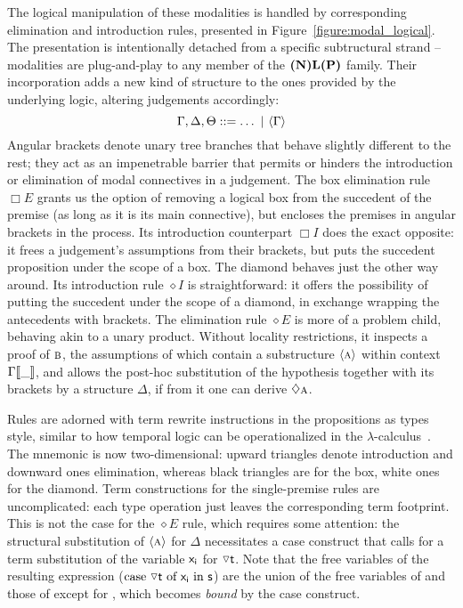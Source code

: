 The logical manipulation of these modalities is handled by corresponding elimination and introduction rules, presented in Figure~\ref{figure:modal_logical}.
The presentation is intentionally detached from a specific subtructural strand -- modalities are plug-and-play to any member of the $\textbf{(N)L(P)}$ family.
Their incorporation adds a new kind of structure to the ones provided by the underlying logic, altering judgements accordingly:
\[
	\Gamma, \Delta, \Theta ::= \dots \ | \ \bracket{\Gamma}
\]
Angular brackets denote unary tree branches that behave slightly different to the rest; they act as an impenetrable barrier that permits or hinders the introduction or elimination of modal connectives in a judgement.
The box elimination rule $\Box E$ grants us the option of removing a logical box from the succedent of the premise (as long as it is its main connective), but encloses the premises in angular brackets in the process.
Its introduction counterpart $\Box I$ does the exact opposite: it frees a judgement's assumptions from their brackets, but puts the succedent proposition under the scope of a box.
The diamond behaves just the other way around.
Its introduction rule $\diamond I$ is straightforward: it offers the possibility of putting the succedent under the scope of a diamond, in exchange wrapping the antecedents with brackets.
The elimination rule $\diamond E$ is more of a problem child, behaving akin to a unary product.
Without locality restrictions, it inspects a proof of $\smallprop{B}$, the assumptions of which contain a substructure $\bracket{\smallprop{A}}$ within context $\Gamma{\llbracket{\_}\rrbracket}$, and allows the post-hoc substitution of the hypothesis together with its brackets by a structure $\Delta$, if from it one can derive $\diamond \smallprop{A}$.

Rules are adorned with term rewrite instructions in the propositions as types style, similar to how temporal logic can be operationalized in the $\lambda$-calculus~\cite{wansing2002sequent}.
The mnemonic is now two-dimensional: upward triangles denote introduction and downward ones elimination, whereas black triangles are for the box, white ones for the diamond.
Term constructions for the single-premise rules are uncomplicated: each type operation just leaves the corresponding term footprint.
This is not the case for the $\diamond E$ rule, which requires some attention:
the structural substitution of $\bracket{\smallprop{A}}$ for $\Delta$ necessitates a case construct that calls for a term substitution of the variable $\mathsf{x_i }$ for $\diaelim\smallterm{t}$.
Note that the free variables of the resulting expression ($\caseof{\diaelim t}{x_i }{s}$) are the union of the free variables of  and those of  except for , which becomes \textit{bound} by the case construct.

